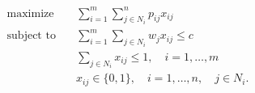 \begin{align*}
\text{maximize} \quad & \sum_{i=1}^m \sum_{j \in N_i}^n p_{ij} x_{ij} \\
\text{subject to} \quad & \sum_{i=1}^m \sum_{j \in N_i} w_j x_{ij} \leq c \\
& \sum_{j \in N_i} x_{ij} \leq 1, \quad i = 1, \ldots, m \\
& x_{ij} \in \lbrace 0, 1 \rbrace, \quad i = 1, \ldots, n, \quad j \in N_i.
\end{align*}

